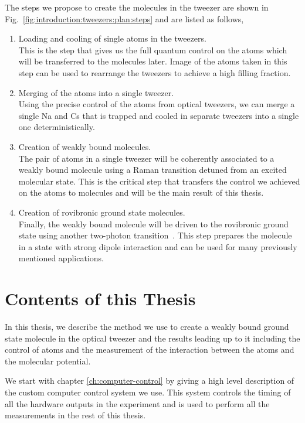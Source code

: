 The steps we propose to create the molecules in the tweezer are shown in
Fig.~\ref{fig:introduction:tweezers:plan:steps} and are listed as follows,
\begin{enumerate}
\item Loading and cooling of single atoms in the tweezers.\\
  This is the step that gives us the full quantum control on the atoms
  which will be transferred to the molecules later.
  Image of the atoms taken in this step can be used to rearrange the tweezers
  to achieve a high filling fraction.
\item Merging of the atoms into a single tweezer.\\
  Using the precise control of the atoms from optical tweezers,
  we can merge a single Na and Cs that is trapped and cooled in separate tweezers
  into a single one deterministically.
\item Creation of weakly bound molecules.\\
  The pair of atoms in a single tweezer will be coherently associated
  to a weakly bound molecule using a Raman transition detuned from an excited molecular state.
  This is the critical step that transfers the control we achieved
  on the atoms to molecules and will be the main result of this thesis.
\item Creation of rovibronic ground state molecules.\\
  Finally, the weakly bound molecule will be driven to the rovibronic ground state
  using another two-photon transition~\cite{bergmann_coherent_1998}.
  This step prepares the molecule in a state with strong dipole interaction
  and can be used for many previously mentioned applications.
\end{enumerate}

\section{Contents of this Thesis}
\label{ch:introduction:contents}

In this thesis, we describe the method we use to create a weakly bound ground state molecule
in the optical tweezer and the results leading up to it including the control of atoms
and the measurement of the interaction between the atoms and the molecular potential.

We start with chapter \ref{ch:computer-control} by giving a high level description of
the custom computer control system we use.
This system controls the timing of all the hardware outputs in the experiment
and is used to perform all the measurements in the rest of this thesis.

